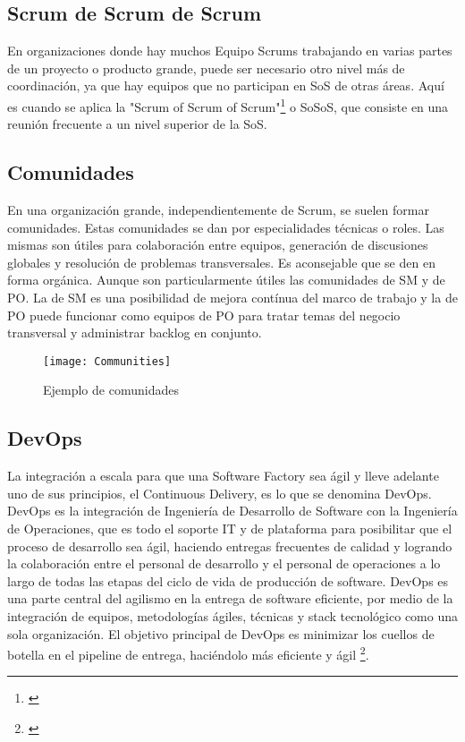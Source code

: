 \subsection{Scrum de Scrum de Scrum}

En organizaciones donde hay muchos Equipo Scrums trabajando en varias partes de un proyecto o producto grande, puede ser necesario otro nivel más de coordinación, ya que hay equipos que no participan en SoS de otras áreas. Aquí es cuando se aplica la "Scrum of Scrum of Scrum"\footnote{\cite{SBOK-2013}} o SoSoS, que consiste en una reunión frecuente a un nivel superior de la SoS.

\subsection{Comunidades}

En una organización grande, independientemente de Scrum, se suelen formar comunidades. Estas comunidades se dan por especialidades técnicas o roles. Las mismas son útiles para colaboración entre equipos, generación de discusiones globales y resolución de problemas transversales. Es aconsejable que se den en forma orgánica. Aunque son particularmente útiles las comunidades de SM y de PO. La de SM es una posibilidad de mejora contínua del marco de trabajo y la de PO puede funcionar como equipos de PO para tratar temas del negocio transversal y administrar backlog en conjunto.

\begin{figure}[h]
  \centering
  \texttt{[image: Communities]}
  \caption{Ejemplo de comunidades}
  \centering
  \label{fig:Communities} %
\end{figure}


\subsection{DevOps}

La integración a escala para que una Software Factory sea ágil y lleve adelante uno de sus principios, el Continuous Delivery, es lo que se denomina DevOps. DevOps es la integración de Ingeniería de Desarrollo de Software con la Ingeniería de Operaciones, que es todo el soporte IT y de plataforma para posibilitar que el proceso de desarrollo sea ágil, haciendo entregas frecuentes de calidad y logrando la colaboración entre el personal de desarrollo y el personal de operaciones a lo largo de todas las etapas del ciclo de vida de producción de software. DevOps es una parte central del agilismo en la entrega de software eficiente, por medio de la integración de equipos, metodologías ágiles, técnicas y stack tecnológico como una sola organización. El objetivo principal de DevOps es minimizar los cuellos de botella en el pipeline de entrega, haciéndolo más eficiente y ágil \footnote{\cite{DevOps-for-dummies-2015}}.

